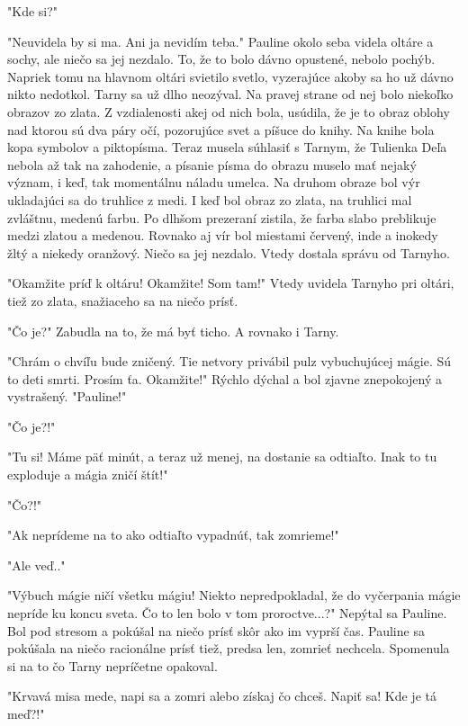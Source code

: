 \documentclass{book}
\begin{document}
"$ $Kde si?"$ $ 

"$ $Neuvidela by si ma. Ani ja nevidím teba."$ $  Pauline okolo seba videla oltáre a sochy, ale niečo sa jej nezdalo. To, že to bolo dávno opustené, nebolo pochýb. Napriek tomu na hlavnom oltári svietilo svetlo, vyzerajúce akoby sa ho už dávno nikto nedotkol. Tarny sa už dlho neozýval. Na pravej strane od nej bolo niekoľko obrazov zo zlata. Z vzdialenosti akej od nich bola, usúdila, že je to obraz oblohy nad ktorou sú dva páry očí, pozorujúce svet a píšuce do knihy. Na knihe bola kopa symbolov a piktopísma. Teraz musela súhlasiť s Tarnym, že Tulienka Deľa nebola až tak na zahodenie, a písanie písma do obrazu muselo mať nejaký význam, i keď, tak momentálnu náladu umelca. Na druhom obraze bol výr ukladajúci sa do truhlice z medi. I keď bol obraz zo zlata, na truhlici mal zvláštnu, medenú farbu. Po dlhšom prezeraní zistila, že farba slabo preblikuje medzi zlatou a medenou. Rovnako aj vír bol miestami červený, inde a inokedy žltý a niekedy oranžový. Niečo sa jej nezdalo. Vtedy dostala správu od Tarnyho.

"$ $Okamžite príď k oltáru! Okamžite! Som tam!"$ $  Vtedy uvidela Tarnyho pri oltári, tiež zo zlata, snažiaceho sa na niečo prísť.

"$ $Čo je?"$ $  Zabudla na to, že má byť ticho. A rovnako i Tarny.

"$ $Chrám o chvíľu bude zničený. Tie netvory privábil pulz vybuchujúcej mágie. Sú to deti smrti. Prosím ťa. Okamžite!"$ $  Rýchlo dýchal a bol zjavne znepokojený a vystrašený. "$ $Pauline!"$ $ 

"$ $Čo je?!"$ $ 

"$ $Tu si! Máme päť minút, a teraz už menej, na dostanie sa odtiaľto. Inak to tu exploduje a mágia zničí štít!"$ $ 

"$ $Čo?!"$ $ 

"$ $Ak neprídeme na to ako odtiaľto vypadnúť, tak zomrieme!"$ $ 

"$ $Ale veď.."$ $ 

"$ $Výbuch mágie ničí všetku mágiu! Niekto nepredpokladal, že do vyčerpania mágie nepríde ku koncu sveta. Čo to len bolo v tom proroctve...?"$ $  Nepýtal sa Pauline. Bol pod stresom a pokúšal na niečo prísť skôr ako im vyprší čas. Pauline sa pokúšala na niečo racionálne prísť tiež, predsa len, zomrieť nechcela. Spomenula si na to čo Tarny nepríčetne opakoval.

"$ $Krvavá misa mede, napi sa a zomri alebo získaj čo chceš. Napiť sa! Kde je tá meď?!"$ $ 
\end{document}
